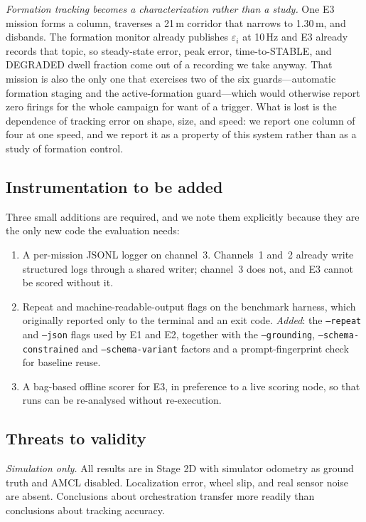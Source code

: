 \documentclass[10pt,twocolumn]{article}
\newcommand{\code}[1]{\texttt{\small #1}}
\begin{document}
\emph{Formation tracking becomes a characterization rather than a study.} One
E3 mission forms a column, traverses a 21\,m corridor that narrows to 1.30\,m,
and disbands. The formation monitor already publishes $\varepsilon_i$ at
10\,Hz and E3 already records that topic, so steady-state error, peak error,
time-to-STABLE, and DEGRADED dwell fraction come out of a recording we take
anyway. That mission is also the only one that exercises two of the six
guards---automatic formation staging and the active-formation guard---which
would otherwise report zero firings for the whole campaign for want of a
trigger. What is lost is the dependence of tracking error on shape, size, and
speed: we report one column of four at one speed, and we report it as a
property of this system rather than as a study of formation control.

\subsection{Instrumentation to be added}

Three small additions are required, and we note them explicitly because they
are the only new code the evaluation needs:

\begin{enumerate}[label=(\roman*)]
\item A per-mission JSONL logger on channel~3. Channels~1 and~2 already write
structured logs through a shared writer; channel~3 does not, and E3 cannot be
scored without it.
\item Repeat and machine-readable-output flags on the benchmark harness, which
originally reported only to the terminal and an exit code. \emph{Added}: the
\code{--repeat} and \code{--json} flags used by E1 and E2, together with the
\code{--grounding}, \code{--schema-constrained} and \code{--schema-variant}
factors and a prompt-fingerprint check for baseline reuse.
\item A bag-based offline scorer for E3, in preference to a live scoring
node, so that runs can be re-analysed without re-execution.
\end{enumerate}

\subsection{Threats to validity}
\label{sec:threats}

\emph{Simulation only.} All results are in Stage 2D with simulator odometry as
ground truth and AMCL disabled. Localization error, wheel slip, and real sensor
noise are absent. Conclusions about orchestration transfer more readily than
conclusions about tracking accuracy.
\end{document}

